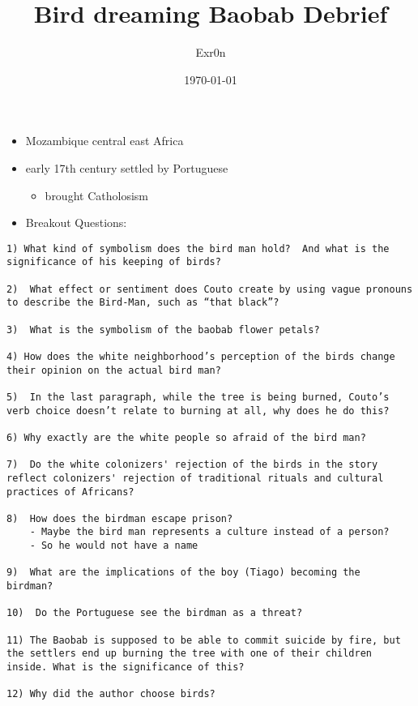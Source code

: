 \documentclass[letterpaper]{article}
\author{Exr0n}
\date{\today}
\title{Bird dreaming Baobab Debrief}
\renewcommand{\tableofcontents}{}
\begin{document}
\tableofcontents

\begin{itemize}
\item Mozambique central east Africa
\item early 17th century settled by Portuguese

\begin{itemize}
\item brought Catholosism
\end{itemize}

\item Breakout Questions:
\end{itemize}

\begin{verbatim}
1) What kind of symbolism does the bird man hold?  And what is the significance of his keeping of birds?

2)  What effect or sentiment does Couto create by using vague pronouns to describe the Bird-Man, such as “that black”? 

3)  What is the symbolism of the baobab flower petals? 

4) How does the white neighborhood’s perception of the birds change their opinion on the actual bird man? 

5)  In the last paragraph, while the tree is being burned, Couto’s verb choice doesn’t relate to burning at all, why does he do this?

6) Why exactly are the white people so afraid of the bird man? 

7)  Do the white colonizers' rejection of the birds in the story reflect colonizers' rejection of traditional rituals and cultural practices of Africans? 

8)  How does the birdman escape prison? 
    - Maybe the bird man represents a culture instead of a person?
    - So he would not have a name

9)  What are the implications of the boy (Tiago) becoming the birdman? 

10)  Do the Portuguese see the birdman as a threat? 

11) The Baobab is supposed to be able to commit suicide by fire, but the settlers end up burning the tree with one of their children inside. What is the significance of this?

12) Why did the author choose birds?
\end{verbatim}
\end{document}
